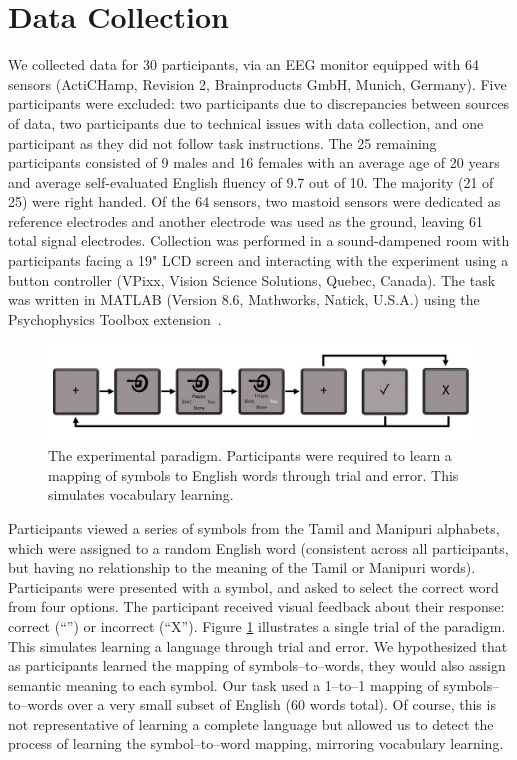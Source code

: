 \section{Data Collection}

We collected data for 30 participants, via an EEG monitor equipped with 64 sensors (ActiCHamp, Revision 2, Brainproducts GmbH, Munich, Germany). Five participants were excluded: two participants due to discrepancies between sources of data, two participants due to technical issues with data collection, and one participant as they did not follow task instructions. The 25 remaining participants consisted of 9 males and 16 females with an average age of 20 years and average self-evaluated English fluency of 9.7 out of 10. The majority (21 of 25) were right handed. Of the 64 sensors, two mastoid sensors were dedicated as reference electrodes and another electrode was used as the ground, leaving 61 total signal electrodes. Collection was performed in a sound-dampened room with participants facing a 19" LCD screen and interacting with the experiment using a button controller (VPixx, Vision Science Solutions, Quebec, Canada). The task was written in MATLAB (Version 8.6, Mathworks, Natick, U.S.A.) using the Psychophysics Toolbox extension~\cite{brainard1997psychophysics}.


\begin{figure}[t]
  \centering
  \includegraphics[width=\linewidth]{figures/experiment}
  \caption{The experimental paradigm. Participants were required to learn a mapping of symbols to English words through trial and error. This simulates vocabulary learning.}
  \label{fig:experiment}
\end{figure}

Participants viewed a series of symbols from the Tamil and Manipuri alphabets, which were assigned to a random English word (consistent across all participants, but having no relationship to the meaning of the Tamil or Manipuri words).  Participants were presented with a symbol, and asked to select the correct word from four options. The participant received visual feedback about their response: correct (``\CheckmarkBold'') or incorrect (``X''). Figure \ref{fig:experiment} illustrates a single trial of the paradigm. This simulates learning a language through trial and error. We hypothesized that as participants learned the mapping of symbols--to--words, they would also assign semantic meaning to each symbol. Our task used a 1--to--1 mapping of symbols--to--words over a very small subset of English (60 words total). Of course, this is not representative of learning a complete language but allowed us to detect the process of learning the symbol--to--word mapping, mirroring vocabulary learning.

